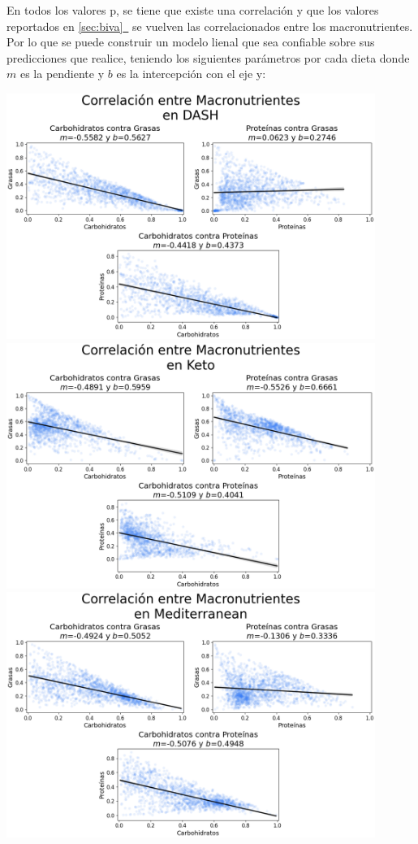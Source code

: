 \documentclass[12pt,a4paper]{article}
\newcommand{\fullref}[1]{%
  \hyperref[#1]{\cref*{#1}~\nameref*{#1}}%
}
\begin{document}
{{            En todos los valores p, se tiene que existe una correlación y que los valores 
            reportados en \fullref{sec:biva} se vuelven las correlacionados entre los 
            macronutrientes. Por lo que se puede construir un modelo lienal que sea confiable 
            sobre sus predicciones que realice, teniendo los siguientes parámetros por 
            cada dieta donde $m$ es la pendiente y $b$ es la intercepción con el eje y:

            \begin{center}
                \includegraphics[width=0.9\textwidth]{Resources/Bivariado/RegressionDash.png}\\
                \includegraphics[width=0.9\textwidth]{Resources/Bivariado/RegressionKeto.png}\\
                \includegraphics[width=0.9\textwidth]{Resources/Bivariado/RegressionMediterranean.png}\\

\end{center}}}
\end{document}
